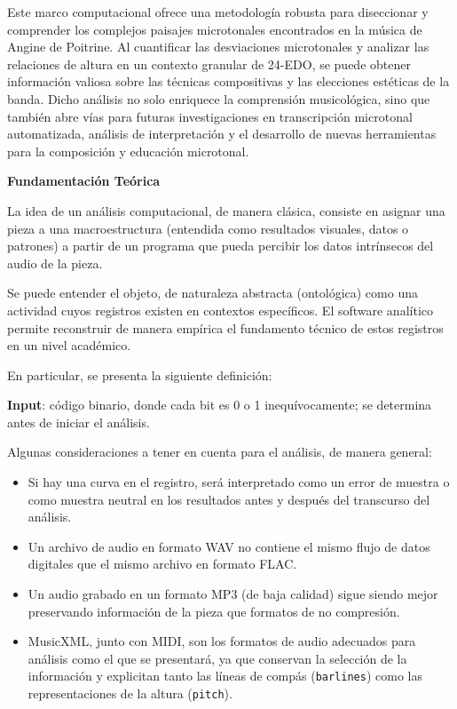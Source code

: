 \documentclass[11pt, a4paper]{article}
\begin{document}
Este marco computacional ofrece una metodología robusta para diseccionar y comprender los complejos paisajes microtonales encontrados en la música de Angine de Poitrine. Al cuantificar las desviaciones microtonales y analizar las relaciones de altura en un contexto granular de 24-EDO, se puede obtener información valiosa sobre las técnicas compositivas y las elecciones estéticas de la banda. Dicho análisis no solo enriquece la comprensión musicológica, sino que también abre vías para futuras investigaciones en transcripción microtonal automatizada, análisis de interpretación y el desarrollo de nuevas herramientas para la composición y educación microtonal.

\vspace{0.5em}
{\color{accent}\Large\textbf{Fundamentación Teórica}}\par
\vspace{0.2em}

La idea de un análisis computacional, de manera clásica, consiste en asignar una pieza a una macroestructura (entendida como resultados visuales, datos o patrones) a partir de un programa que pueda percibir los datos intrínsecos del audio de la pieza.

Se puede entender el objeto, de naturaleza abstracta (ontológica) como una actividad cuyos registros existen en contextos específicos. El software analítico permite reconstruir de manera empírica el fundamento técnico de estos registros en un nivel académico.

En particular, se presenta la siguiente definición:

\textbf{Input}: código binario, donde cada bit es 0 o 1 inequívocamente; se determina antes de iniciar el análisis.

Algunas consideraciones a tener en cuenta para el análisis, de manera general:

\begin{itemize}
    \item Si hay una curva en el registro, será interpretado como un error de muestra o como muestra neutral en los resultados antes y después del transcurso del análisis.
    \item Un archivo de audio en formato WAV no contiene el mismo flujo de datos digitales que el mismo archivo en formato FLAC.
    \item Un audio grabado en un formato MP3 (de baja calidad) sigue siendo mejor preservando información de la pieza que formatos de no compresión.
    \item MusicXML, junto con MIDI, son los formatos de audio adecuados para análisis como el que se presentará, ya que conservan la selección de la información y explicitan tanto las líneas de compás (\texttt{barlines}) como las representaciones de la altura (\texttt{pitch}).
\end{itemize}
\end{document}
